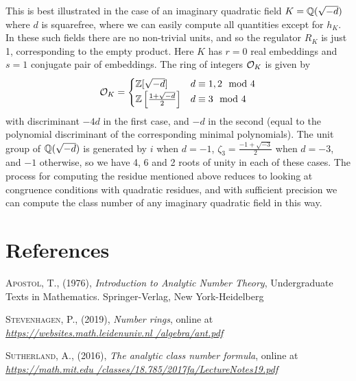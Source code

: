 \documentclass[11pt]{report}
\begin{document}
This is best illustrated in the case of an imaginary quadratic field $K = \Q(\sqrt{-d})$ where $d$ is squarefree, where we can easily compute all quantities except for $h_K$. In these such fields there are no non-trivial units, and so the regulator $R_K$ is just 1, corresponding to the empty product. Here $K$ has $r = 0$ real embeddings and $s = 1$ conjugate pair of embeddings. The ring of integers $\o_K$ is given by
\begin{align*}
    \o_K = \begin{cases}
        \Z[\sqrt{-d}] &d \equiv 1, 2 \mod 4 \\
        \Z\lr[]{\frac{1 + \sqrt{-d}}{2}} &d\equiv 3 \mod 4
    \end{cases}
\end{align*}
with discriminant $-4d$ in the first case, and $-d$ in the second (equal to the polynomial discriminant of the corresponding minimal polynomials). The unit group of $\Q(\sqrt{-d})$ is generated by $i$ when $d = -1$, $\zeta_3 = \frac{-1 + \sqrt{-3}}{2}$ when $d = -3$, and $-1$ otherwise, so we have 4, 6 and 2 roots of unity in each of these cases. The process for computing the residue mentioned above reduces to looking at congruence conditions with quadratic residues, and with sufficient precision we can compute the class number of any imaginary quadratic field in this way.
\chapter{References}
\begin{enum}
    \item \hypertarget{apostol}{\textsc{Apostol, T.}, (1976), \emph{Introduction to Analytic Number Theory}, Undergraduate Texts in Mathematics. Springer-Verlag, New York-Heidelberg}
    \item \hypertarget{stevenhagen}{\textsc{Stevenhagen, P.}, (2019), \emph{Number rings}, online at \emph{\color{blue}\href{https://websites.math.leidenuniv.nl/algebra/ant.pdf}{https://websites.math.leidenuniv.nl /algebra/ant.pdf}\color{black}}}
    \item \hypertarget{sutherland}{\textsc{Sutherland, A.}, (2016), \emph{The analytic class number formula}, online at \emph{\color{blue}\href{https://math.mit.edu/classes/18.785/2017fa/LectureNotes19.pdf}{https://math.mit.edu /classes/18.785/2017fa/LectureNotes19.pdf}\color{black}}}
\end{enum}

\end{document}

